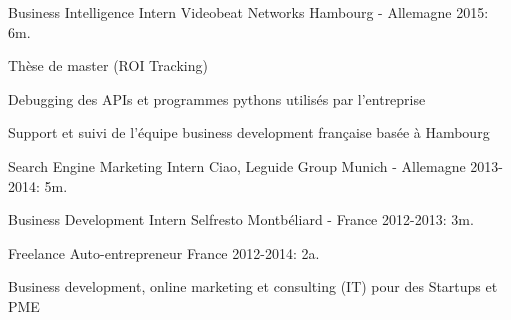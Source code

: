 \begin{cventries}
  \cventry
    {Business Intelligence Intern} %
    {Videobeat Networks} %
    {Hambourg - Allemagne} %
    {2015: 6m.} %
    {
      \begin{cvitems} %
       \item {Thèse de master (ROI Tracking)}
        \item {Debugging des APIs et programmes pythons utilisés par l'entreprise}
        \item {Support et suivi de l'équipe business development française basée à Hambourg}
      \end{cvitems}
    }

  \cventry
    {Search Engine Marketing Intern} %
    {Ciao, Leguide Group} %
    {Munich - Allemagne} %
    {2013-2014: 5m.} %
    {
    }
    
	\cventry
	{Business Development Intern} %
	{Selfresto} %
	{Montbéliard - France} %
	{2012-2013: 3m.} %
	{
	}
	
  \cventry
    {Freelance} %
    {Auto-entrepreneur} %
    {France} %
    {2012-2014: 2a.} %
    {	
      \begin{cvitems} %
      	\item{Business development, online marketing et consulting (IT) pour des Startups et PME}
      \end{cvitems}
    }

\end{cventries}
